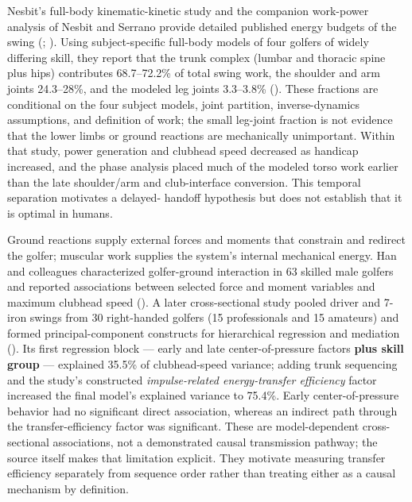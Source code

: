 \documentclass[
  letterpaper,
]{report}
\begin{document}
Nesbit's full-body kinematic-kinetic study and the companion work-power
analysis of Nesbit and Serrano provide detailed published energy budgets
of the swing (;
). Using
subject-specific full-body models of four golfers of widely differing
skill, they report that the trunk complex (lumbar and thoracic spine
plus hips) contributes 68.7--72.2\% of total swing work, the shoulder
and arm joints 24.3--28\%, and the modeled leg joints 3.3--3.8\%
(). These
fractions are conditional on the four subject models, joint partition,
inverse-dynamics assumptions, and definition of work; the small
leg-joint fraction is not evidence that the lower limbs or ground
reactions are mechanically unimportant. Within that study, power
generation and clubhead speed decreased as handicap increased, and the
phase analysis placed much of the modeled torso work earlier than the
late shoulder/arm and club-interface conversion. This temporal
separation motivates a delayed- handoff hypothesis but does not
establish that it is optimal in humans.

Ground reactions supply external forces and moments that constrain and
redirect the golfer; muscular work supplies the system's internal
mechanical energy. Han and colleagues characterized golfer-ground
interaction in 63 skilled male golfers and reported associations between
selected force and moment variables and maximum clubhead speed
(). A later cross-sectional study
pooled driver and 7-iron swings from 30 right-handed golfers (15
professionals and 15 amateurs) and formed principal-component constructs
for hierarchical regression and mediation
(). Its
first regression block --- early and late center-of-pressure factors
\textbf{plus skill group} --- explained 35.5\% of clubhead-speed
variance; adding trunk sequencing and the study's constructed
\emph{impulse-related energy-transfer efficiency} factor increased the
final model's explained variance to 75.4\%. Early center-of-pressure
behavior had no significant direct association, whereas an indirect path
through the transfer-efficiency factor was significant. These are
model-dependent cross-sectional associations, not a demonstrated causal
transmission pathway; the source itself makes that limitation explicit.
They motivate measuring transfer efficiency separately from sequence
order rather than treating either as a causal mechanism by definition.
\end{document}
